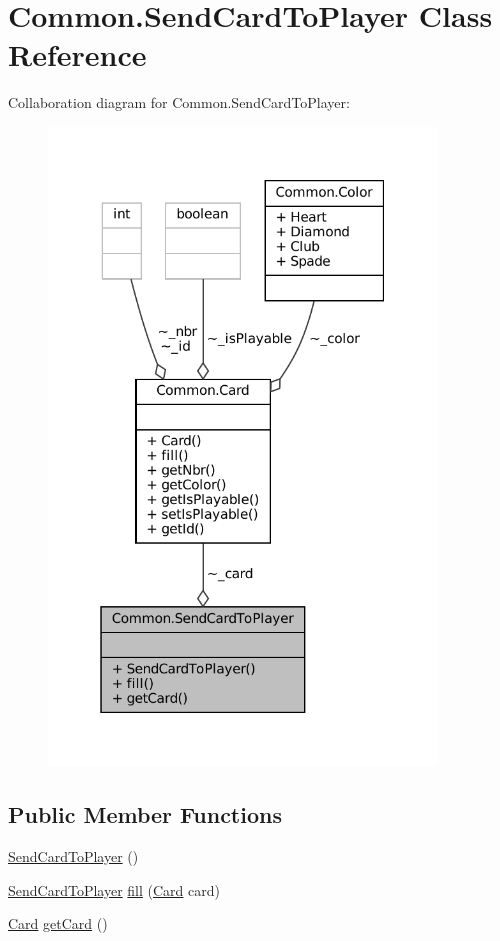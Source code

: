 \hypertarget{classCommon_1_1SendCardToPlayer}{}\section{Common.\+Send\+Card\+To\+Player Class Reference}
\label{classCommon_1_1SendCardToPlayer}


Collaboration diagram for Common.\+Send\+Card\+To\+Player\+:
\nopagebreak
\begin{figure}[H]
\begin{center}
\leavevmode
\includegraphics[width=292pt]{classCommon_1_1SendCardToPlayer__coll__graph}
\end{center}
\end{figure}
\subsection*{Public Member Functions}
\begin{DoxyCompactItemize}
\item 
\mbox{\hyperlink{classCommon_1_1SendCardToPlayer_abb4ae3f97446d7b5bf4c54d2cfb095b0}{Send\+Card\+To\+Player}} ()
\item 
\mbox{\hyperlink{classCommon_1_1SendCardToPlayer}{Send\+Card\+To\+Player}} \mbox{\hyperlink{classCommon_1_1SendCardToPlayer_aaf5d1cdf5516599d15f7f0888eb9500a}{fill}} (\mbox{\hyperlink{classCommon_1_1Card}{Card}} card)
\item 
\mbox{\hyperlink{classCommon_1_1Card}{Card}} \mbox{\hyperlink{classCommon_1_1SendCardToPlayer_a63b0f14afc271a12b147caf267a52e23}{get\+Card}} ()
\end{DoxyCompactItemize}


